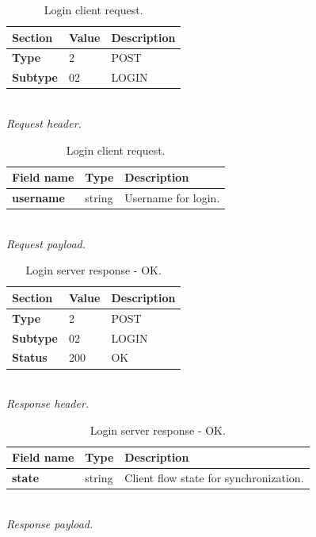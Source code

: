 \documentclass[english, sem, kiv, he, iso690alph, pdf, viewonly]{fasthesis}
\begin{document}
\begin{table}[h]
	\centering
	\begin{minipage}[b]{0.45\textwidth}
		\centering
		\begin{tabular}{|l|l|l|}
			\hline
			\textbf{Section} & \textbf{Value} & \textbf{Description} \\ \hline
			\textbf{Type} & 2 & POST \\ \hline
			\textbf{Subtype} & 02 & LOGIN \\ \hline
		\end{tabular} \\
		\textit{Request header.}
	\end{minipage} 
	\hfill
	\begin{minipage}[b]{0.45\textwidth}
		\centering
		\begin{tabular}{|l|l|l|}
			\hline
			\textbf{Field name} & \textbf{Type} & \textbf{Description} \\ \hline
			\textbf{username} & string & Username for login. \\ \hline
		\end{tabular} \\
		\textit{Request payload.}
	\end{minipage}	
	\caption{Login client request.}
	\label{tab:login_client_request}
\end{table}

\begin{table}[h]
	\centering
	\begin{minipage}[b]{0.45\textwidth}
		\centering
		\begin{tabular}{|l|l|l|}
			\hline
			\textbf{Section} & \textbf{Value} & \textbf{Description} \\ \hline
			\textbf{Type} & 2 & POST \\ \hline
			\textbf{Subtype} & 02 & LOGIN \\ \hline
			\textbf{Status} & 200 & OK \\ \hline
		\end{tabular} \\
		\textit{Response header.}
	\end{minipage} 
	\hfill
	\begin{minipage}[b]{0.45\textwidth}
		\centering
		\begin{tabular}{|l|l|p{95pt}|}
			\hline
			\textbf{Field name} & \textbf{Type} & \textbf{Description} \\ \hline
			\textbf{state} & string & Client flow state for synchronization. \\ \hline
		\end{tabular} \\
		\textit{Response payload.}
	\end{minipage}	
	\caption{Login server response - OK.}
	\label{tab:login_server_response_ok}
\end{table}
\end{document}
